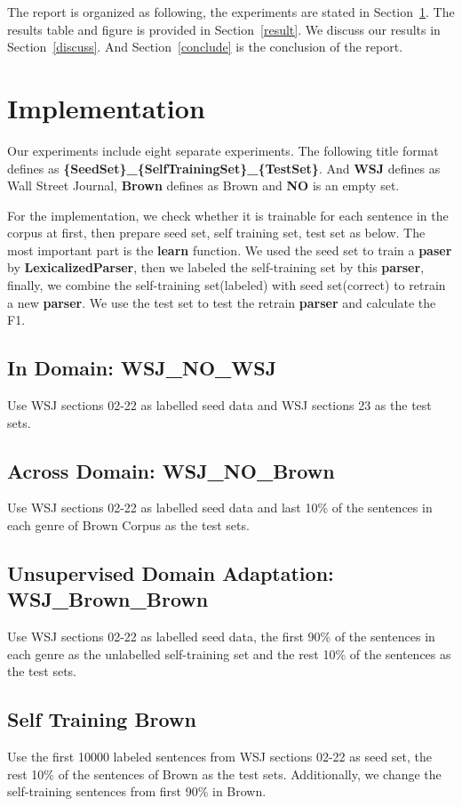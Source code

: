 \documentclass[journal, a4paper]{IEEEtran}
\begin{document}
The report is organized as following, the experiments are stated in Section~\ref{compare}. The results table and figure is provided in Section~\ref{result}. We discuss our results in Section~\ref{discuss}. And Section~\ref{conclude} is the conclusion of the report.

\section{Implementation}\label{compare}
Our experiments include eight separate experiments. The following title format defines as {\bf \{SeedSet\}\_\{SelfTrainingSet\}\_\{TestSet\}}. And {\bf WSJ} defines as Wall Street Journal, {\bf Brown} defines as Brown and {\bf NO} is an empty set.

For the implementation, we check whether it is trainable for each sentence in the corpus at first, then prepare seed set, self training set, test set as below. The most important part is the {\bf learn} function. We used the seed set to train a {\bf paser} by {\bf LexicalizedParser}, then we labeled the self-training set by this {\bf parser}, finally, we combine the self-training set(labeled) with seed set(correct) to retrain a new {\bf parser}. We use the test set to test the retrain {\bf parser} and calculate the F1.

\subsection{In Domain: WSJ\_NO\_WSJ}
Use WSJ sections 02-22 as labelled seed data and WSJ sections 23 as the test sets.

\subsection{Across Domain: WSJ\_NO\_Brown}
Use WSJ sections 02-22 as labelled seed data and last 10\% of the sentences in each genre of Brown Corpus as the test sets.

\subsection{Unsupervised Domain Adaptation: WSJ\_Brown\_Brown}
Use WSJ sections 02-22 as labelled seed data, the first 90\% of the sentences in each genre as the unlabelled self-training set and the rest 10\% of the sentences as the test sets.

\subsection{Self Training Brown}
Use the first 10000 labeled sentences from WSJ sections 02-22 as seed set, the rest 10\% of the sentences of Brown as the test sets. Additionally, we change the self-training sentences from first 90\% in Brown.
\end{document}
